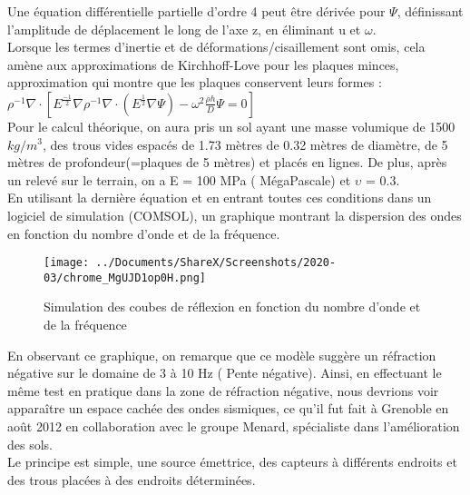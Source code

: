 \documentclass[12pt,a4paper]{article}
\begin{document}
	Une équation différentielle partielle d'ordre 4 peut être dérivée pour $\Psi$, définissant l’amplitude de déplacement le long de l’axe z, en éliminant u et $\omega$. \\ 
	
	Lorsque les termes d’inertie et de déformations/cisaillement sont omis, cela amène aux approximations de Kirchhoff-Love pour les plaques minces, approximation qui montre que les plaques conservent leurs formes : \\
	
	\large\hspace{3cm}\textbf{$\rho^{-1}\nabla\cdot[E^{\frac{-1}{2}}\nabla\rho^{-1}\nabla\cdot(E^{\frac{1}{2}}\nabla\Psi)-\omega^{2}\frac{\rho h}{D}\Psi =0]$} \normalsize\\
	
	Pour le calcul théorique, on aura pris un sol ayant une masse volumique de 1500$kg/m^{3}$, des trous vides espacés de 1.73 mètres de 0.32 mètres de diamètre, de 5 mètres de profondeur(=plaques de 5 mètres) et placés en lignes. De plus, après un relevé sur le terrain, on a E = 100 MPa ( MégaPascale) et $\upsilon$ = 0.3.\\

	En utilisant la dernière équation et en entrant toutes ces conditions dans un logiciel de simulation (COMSOL), un graphique montrant la dispersion des ondes en fonction du nombre d’onde et de la fréquence.\\
	
\begin{figure}[hbtp]
	\centering
	\texttt{[image: ../Documents/ShareX/Screenshots/2020-03/chrome\_MgUJD1op0H.png]}
	\caption{Simulation des coubes de réflexion en fonction du nombre d'onde et de la fréquence}
\end{figure} 
	En observant ce graphique, on remarque que ce modèle suggère un réfraction négative sur le domaine de 3 à 10 Hz ( Pente négative). Ainsi, en effectuant le même test en pratique dans la zone de réfraction négative, nous devrions voir apparaître un espace cachée des ondes sismiques, ce qu’il fut fait à Grenoble en août 2012 en collaboration avec le groupe Menard, spécialiste dans l’amélioration des sols.\\

	Le principe est simple, une source émettrice, des capteurs à différents endroits et des trous placées à des endroits déterminées.\\
	
\end{document}
